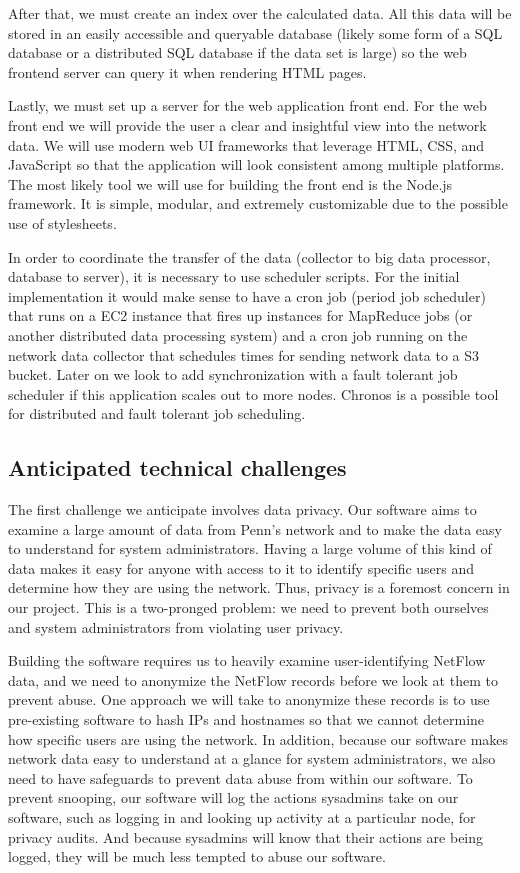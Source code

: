 \documentclass{sig-alternate}
\begin{document}
After that, we must create an index over the calculated data. All this data will
be stored in an easily accessible and queryable database (likely some form of a
SQL database or a distributed SQL database if the data set is large) so the web
frontend server can query it when rendering HTML pages.

Lastly, we must set up a server for the web application front end. For the web
front end we will provide the user a clear and insightful view into the network
data. We will use modern web UI frameworks that leverage HTML, CSS, and
JavaScript so that the application will look consistent among multiple
platforms. The most likely tool we will use for building the front end is the
Node.js framework. It is simple, modular, and extremely customizable due to the
possible use of stylesheets.

In order to coordinate the transfer of the data (collector to big data
processor, database to server), it is necessary to use scheduler scripts. For
the initial implementation it would make sense to have a cron job (period job
scheduler) that runs on a EC2 instance that fires up instances for MapReduce
jobs (or another distributed data processing system) and a cron job running on
the network data collector that schedules times for sending network data to a S3
bucket. Later on we look to add synchronization with a fault tolerant job
scheduler if this application scales out to more nodes. Chronos is a possible
tool for distributed and fault tolerant job scheduling.\cite{AirbnbChronos}

\subsection{Anticipated technical challenges}

The first challenge we anticipate involves data privacy. Our software aims to
examine a large amount of data from Penn's network and to make the data easy to
understand for system administrators. Having a large volume of this kind of data
makes it easy for anyone with access to it to identify specific users and
determine how they are using the network. Thus, privacy is a foremost concern in
our project. This is a two-pronged problem: we need to prevent both ourselves
and system administrators from violating user privacy.

Building the software requires us to heavily examine user-identifying NetFlow
data, and we need to anonymize the NetFlow records before we look at them to
prevent abuse. One approach we will take to anonymize these records is to use
pre-existing software to hash IPs and hostnames so that we cannot determine how
specific users are using the network. In addition, because our software makes
network data easy to understand at a glance for system administrators, we also
need to have safeguards to prevent data abuse from within our software. To
prevent snooping, our software will log the actions sysadmins take on our
software, such as logging in and looking up activity at a particular node, for
privacy audits. And because sysadmins will know that their actions are being
logged, they will be much less tempted to abuse our software.
\end{document}

